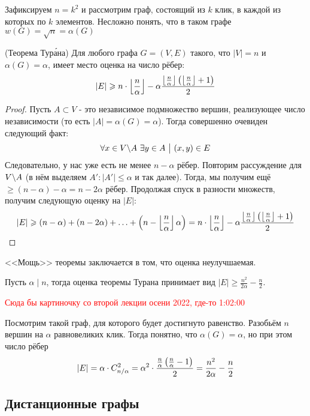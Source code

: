 \begin{example}
	Зафиксируем $n = k^2$ и рассмотрим граф, состоящий из $k$ клик, в каждой из которых по $k$ элементов. Несложно понять, что в таком графе $w(G) = \sqrt{n} = \alpha(G)$
\end{example}

\begin{theorem} (Теорема Тур\'{а}на)
	Для любого графа $G = (V, E)$ такого, что $|V| = n$ и $\alpha(G) = \alpha$, имеет место оценка на число рёбер:
	\[
		|E| \geqslant n \cdot \left\lfloor \frac{n}{\alpha} \right\rfloor - \alpha \frac{\left\lfloor \frac{n}{\alpha} \right\rfloor\left(\left\lfloor \frac{n}{\alpha} \right\rfloor + 1\right)}{2}
	\]
\end{theorem}

\begin{proof}
	Пусть $A \subset V$ - это независимое подмножество вершин, реализующее число независимости (то есть $|A| = \alpha(G) = \alpha$). Тогда совершенно очевиден следующий факт:
	\[
		\forall x \in V \backslash A\ \exists y \in A \ \big|\  (x, y) \in E
	\]
	Следовательно, у нас уже есть не менее $n - \alpha$ рёбер. Повторим рассуждение для $V \backslash A$ (в нём выделяем $A' \colon |A'| \le \alpha$ и так далее). Тогда, мы получим ещё $\ge (n - \alpha) - \alpha = n - 2\alpha$ рёбер. Продолжая спуск в разности множеств, получим следующую оценку на $|E|$:
	\[
		|E| \geqslant (n - \alpha) + (n - 2\alpha) + \ldots + \left(n - \left\lfloor \frac{n}{\alpha} \right\rfloor\alpha\right) = n \cdot \left\lfloor \frac{n}{\alpha} \right\rfloor - \alpha \frac{\left\lfloor \frac{n}{\alpha} \right\rfloor\left(\left\lfloor \frac{n}{\alpha} \right\rfloor + 1\right)}{2}
	\]
\end{proof}

\begin{note}
	<<Мощь>> теоремы заключается в том, что оценка неулучшаемая.
\end{note}

\begin{example}
	Пусть $\alpha \mid n$, тогда оценка теоремы Турана принимает вид $|E| \ge \frac{n^2}{2\alpha} - \frac{n}{2}$.
	
	\textcolor{red}{Сюда бы картиночку со второй лекции осени 2022, где-то 1:02:00}
	
	Посмотрим такой граф, для которого будет достигнуто равенство. Разобьём $n$ вершин на $\alpha$ равновеликих клик. Тогда понятно, что $\alpha(G) = \alpha$, но при этом число рёбер
	\[
		|E| = \alpha \cdot C_{n / \alpha}^2 = \alpha^2 \cdot \frac{\frac{n}{\alpha} \left(\frac{n}{\alpha} - 1\right)}{2} = \frac{n^2}{2\alpha} - \frac{n}{2}
	\]
\end{example}

\subsection{Дистанционные графы}

